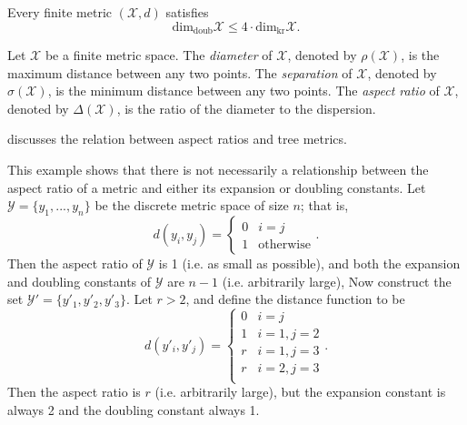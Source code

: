 \documentclass[../main.tex]{subfiles}
\newcommand{\set}[1]{\mathcal {#1}}
\newcommand{\dist}[2]{\distf({#1},{#2})}
\newcommand{\distf}{d}
\newcommand{\diam}[1]{\rho({#1})}
\newcommand{\sep}[1]{\sigma({#1})}
\newcommand{\aspect}[1]{\Delta({#1})}
\newcommand{\krdim}{\text{dim}_\text{kr}}
\newcommand{\doubdim}{\text{dim}_\text{doub}}
\begin{document}
\begin{lemma}
    Every finite metric $(\set X,d)$ satisfies
    \begin{equation}
        \doubdim\set X \le 4\cdot\krdim\set X
        .
    \end{equation}
\end{lemma}

\begin{definition}
    Let $\set X$ be a finite metric space.
    The \emph{diameter} of $\set X$, denoted by $\diam{\set X}$, is the maximum distance between any two points.
    The \emph{separation} of $\set X$, denoted by $\sep{\set X}$, is the minimum distance between any two points.
    The \emph{aspect ratio} of $\set X$, denoted by $\aspect{\set X}$, is the ratio of the diameter to the dispersion.
\end{definition}

\cite{bartal2003metric} discusses the relation between aspect ratios and tree metrics.

\begin{example}
    This example shows that there is not necessarily a relationship between the aspect ratio of a metric and either its expansion or doubling constants.
    Let $\set Y=\{y_1,...,y_n\}$ be the discrete metric space of size $n$;
    that is,
    \begin{equation}
        \dist{y_i}{y_j}=
        \begin{cases}
            0 & i = j \\
            1 & \text{otherwise}
        \end{cases}
        .
    \end{equation}
    Then the aspect ratio of $\set Y$ is 1 (i.e. as small as possible),
    and both the expansion and doubling constants of $\set Y$ are $n-1$ (i.e. arbitrarily large),
    Now construct the set $\set Y'=\{y'_1, y'_2, y'_3\}$.
    Let $r>2$, and define the distance function to be
    \begin{equation}
        d(y'_i,y'_j) =
        \begin{cases}
            0 & i=j \\
            1 & i=1, j=2 \\
            r & i=1, j=3 \\
            r & i=2, j=3 \\
        \end{cases}
        .
    \end{equation}
    Then the aspect ratio is $r$ (i.e. arbitrarily large),
    but the expansion constant is always 2
    and the doubling constant always 1.
\end{example}
\end{document}

